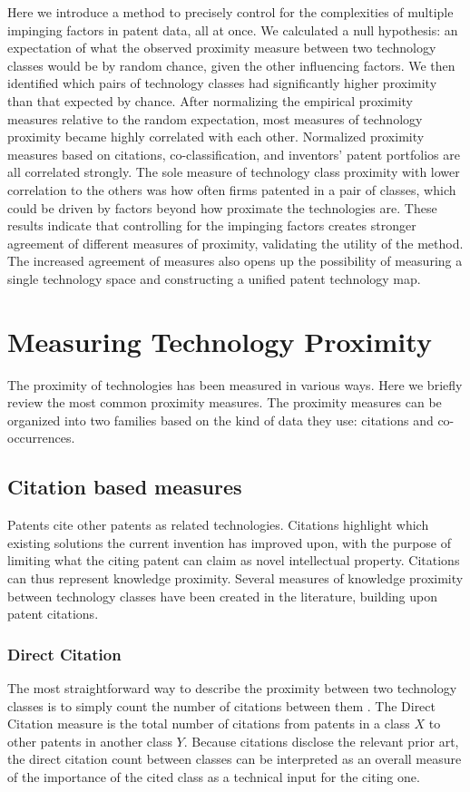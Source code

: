 \documentclass[]{svjour3}
\begin{document}
Here we introduce a method to precisely control for the complexities of multiple impinging factors in patent data, all at once. We calculated a null hypothesis: an expectation of what the observed proximity measure between two technology classes would be by random chance, given the other influencing factors. We then identified which pairs of technology classes had significantly higher proximity than that expected by chance. After normalizing the empirical proximity measures relative to the random expectation, most measures of technology proximity became highly correlated with each other. Normalized proximity measures based on citations, co-classification, and inventors' patent portfolios are all correlated strongly. The sole measure of technology class proximity with lower correlation to the others was how often firms patented in a pair of classes, which could be driven by factors beyond how proximate the technologies are. These results indicate that controlling for the impinging factors creates stronger agreement of different measures of proximity, validating the utility of the method. The increased agreement of measures also opens up the possibility of measuring a single technology space and constructing a unified patent technology map.

\section{Measuring Technology Proximity}\label{measuresreview}
The proximity of technologies has been measured in various ways. Here we briefly review the most common proximity measures. The proximity measures can be organized into two families based on the kind of data they use: citations and co-occurrences.

\subsection{Citation based measures}
Patents cite other patents as related technologies. Citations highlight which existing solutions the current invention has improved upon, with the purpose of limiting what the citing patent can claim as novel intellectual property. Citations can thus represent knowledge proximity. Several measures of knowledge proximity between technology classes have been created in the literature, building upon patent citations.

\subsubsection{Direct Citation}
The most straightforward way to describe the proximity between two technology classes is to simply count the number of citations between them \citep{Leten2007}. The Direct Citation measure is the total number of citations from patents in a class $X$ to other patents in another class $Y$. Because citations disclose the relevant prior art, the direct citation count between classes can be interpreted as an overall measure of the importance of the cited class as a technical input for the citing one. 
\end{document}
